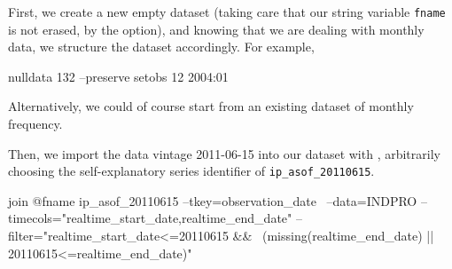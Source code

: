 First, we create a new empty dataset (taking care that our string
variable \texttt{fname} is not erased, by the 
option), and knowing that we are dealing with monthly data, we
structure the dataset accordingly. For example,
\begin{code}
nulldata 132 --preserve
setobs 12 2004:01
\end{code}

Alternatively, we could of course start from an existing dataset of
monthly frequency.

Then, we import the data vintage 2011-06-15 into our dataset
with , arbitrarily choosing the self-explanatory series
identifier of \texttt{ip\_asof\_20110615}.

\begin{code}
join @fname ip_asof_20110615 --tkey=observation_date \
--data=INDPRO --timecols="realtime_start_date,realtime_end_date"
--filter="realtime_start_date<=20110615 && \
(missing(realtime_end_date) || 20110615<=realtime_end_date)"
\end{code}


